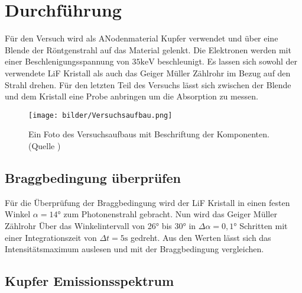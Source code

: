 \section{Durchführung}
\label{sec:Durchfuehrung}
Für den Versuch wird als ANodenmaterial Kupfer verwendet und über eine Blende der Röntgenstrahl auf das Material gelenkt.
Die Elektronen werden mit einer Beschlenigungsspannung von  $35 \text{keV}$ beschleunigt.
Es lassen sich sowohl der verwendete LiF Kristall als auch das Geiger Müller Zählrohr im Bezug auf den Strahl drehen.
Für den letzten Teil des Versuchs lässt sich zwischen der Blende und dem Kristall eine Probe anbringen um die Absorption zu messen.
\begin{figure}
    \centering
    \texttt{[image: bilder/Versuchsaufbau.png]}
    \caption{Ein Foto des Versuchsaufbaus mit Beschriftung der Komponenten. (Quelle \cite{Anleitung})}
    \label{fig:Versuchsaufbau}
\end{figure}

\subsection{Braggbedingung überprüfen}
Für die Überprüfung der Braggbedingung wird der LiF Kristall in einen festen Winkel $\alpha = 14°$ zum Photonenstrahl gebracht.
Nun wird das Geiger Müller Zählrohr Über das Winkelintervall von 26° bis 30° in $\Delta \alpha = 0,1°$ Schritten mit einer Integrationszeit von $\Delta t = 5 \text{s}$ gedreht.
Aus den Werten lässt sich das Intensitätsmaximum auslesen und mit der Braggbedingung vergleichen.
\subsection{Kupfer Emissionsspektrum}